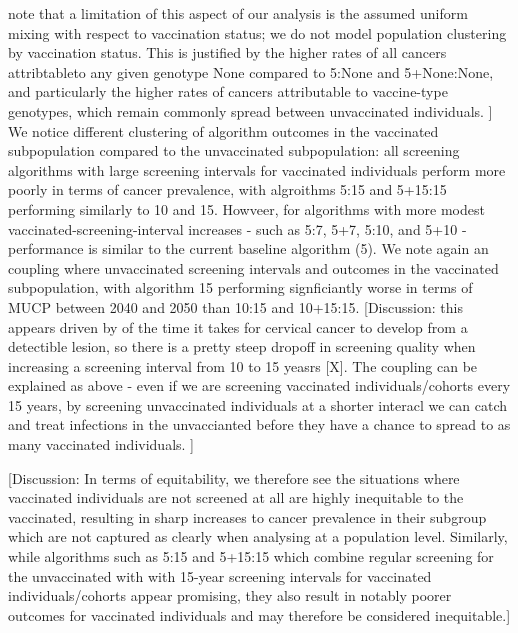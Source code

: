 note that a limitation of this aspect of our analysis is the assumed uniform mixing with respect to vaccination status; we do not model population clustering by vaccination status. This is justified by the higher rates of all cancers attribtableto any given genotype None compared to 5:None and 5+None:None, and particularly the higher rates of cancers attributable to vaccine-type genotypes, which remain commonly spread between unvaccinated individuals. ] We notice different clustering of algorithm outcomes in the vaccinated subpopulation compared to the unvaccinated subpopulation: all screening algorithms with large screening intervals for vaccinated individuals perform more poorly in terms of cancer prevalence, with algroithms 5:15 and 5+15:15 performing similarly to 10 and 15. Howveer, for algorithms with more modest vaccinated-screening-interval increases - such as 5:7, 5+7, 5:10, and 5+10 - performance is similar to the current baseline algorithm (5). We note again an coupling where unvaccinated screening intervals and outcomes in the vaccinated subpopulation, with algorithm 15 performing signficiantly worse in terms of MUCP between 2040 and 2050 than 10:15 and 10+15:15.  [Discussion: this appears driven by of the time it takes for cervical cancer to develop from a detectible lesion, so there is a pretty steep dropoff in screening quality when increasing a screening interval from 10 to 15 yeasrs [X]. The coupling can be explained as above - even if we are screening vaccinated individuals/cohorts every 15 years, by screening unvaccinated individuals at a shorter interacl we can catch and treat infections in the unvaccianted before they have a chance to spread to as many vaccinated individuals. ] 

[Discussion: In terms of equitability, we therefore see the situations where vaccinated individuals are not screened at all are highly inequitable to the vaccinated, resulting in sharp increases to cancer prevalence in their subgroup which are not captured as clearly when analysing at a population level. Similarly, while algorithms such as 5:15 and 5+15:15 which combine regular screening for the unvaccinated with with 15-year screening intervals for vaccinated individuals/cohorts appear promising, they also result in notably poorer outcomes for vaccinated individuals and may therefore be considered inequitable.]



